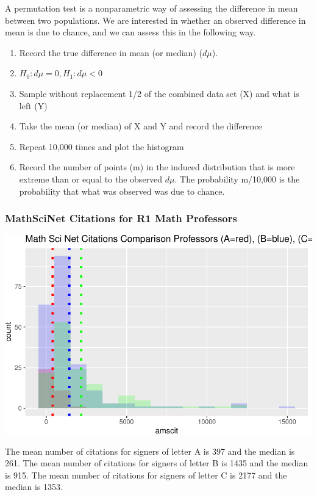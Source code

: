 \documentclass[]{article}
\providecommand{\tightlist}{%
  \setlength{\itemsep}{0pt}\setlength{\parskip}{0pt}}
\begin{document}
A permutation test is a nonparametric way of assessing the difference in
mean between two populations. We are interested in whether an observed
difference in mean is due to chance, and we can assess this in the
following way.

\begin{enumerate}
\def\labelenumi{\arabic{enumi}.}
\setcounter{enumi}{-1}
\tightlist
\item
  Record the true difference in mean (or median) (\(d\mu\)).
\item
  \(H_0: d\mu = 0, H_1: d\mu < 0\)
\item
  Sample without replacement 1/2 of the combined data set (X) and what
  is left (Y)
\item
  Take the mean (or median) of X and Y and record the difference
\item
  Repeat 10,000 times and plot the histogram
\item
  Record the number of points (m) in the induced distribution that is
  more extreme than or equal to the observed \(d\mu\). The probability
  m/10,000 is the probability that what was observed was due to chance.
\end{enumerate}

\hypertarget{mathscinet-citations-for-r1-math-professors}{%
\subsubsection{MathSciNet Citations for R1 Math
Professors}\label{mathscinet-citations-for-r1-math-professors}}

\includegraphics{index_files/figure-latex/unnamed-chunk-10-1.pdf}

The mean number of citations for signers of letter A is 397 and the
median is 261. The mean number of citations for signers of letter B is
1435 and the median is 915. The mean number of citations for signers of
letter C is 2177 and the median is 1353.
\end{document}
